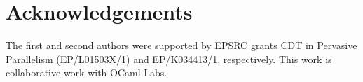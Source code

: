 \documentclass[preprint,numbers]{sigplanconf}
\begin{document}


\section{Acknowledgements}
The first and second authors were supported by EPSRC grants CDT in
Pervasive Parallelism (EP/L01503X/1) and EP/K034413/1,
respectively.  This work is collaborative work with OCaml Labs.

 \softraggedright

\end{document}
